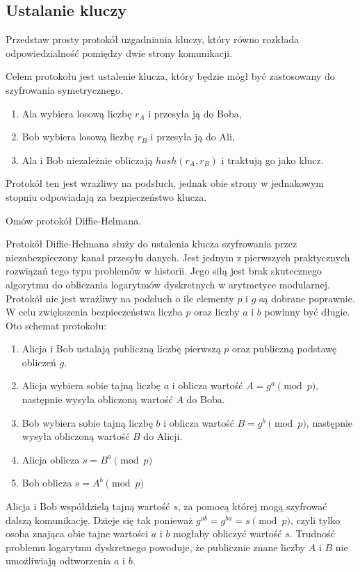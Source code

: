 \documentclass[answers,11pt]{exam}
\begin{document}
\begin{questions}
\end{questions}


\subsection{Ustalanie kluczy}
\begin{questions}

\question Przedstaw prosty protokół uzgadniania kluczy, który równo rozkłada odpowiedzialność pomiędzy dwie strony komunikacji.
\begin{solution}
Celem protokołu jest ustalenie klucza, który będzie mógł być zastosowany do szyfrowania symetrycznego. 
\begin{enumerate}
\item Ala wybiera losową liczbę $r_A$ i przesyła ją do Boba,
\item Bob wybiera losową liczbę $r_B$ i przesyła ją do Ali,
\item Ala i Bob niezależnie obliczają $hash(r_A, r_B)$ i traktują go jako klucz.
\end{enumerate}
Protokół ten jest wrażliwy na podsłuch, jednak obie strony w jednakowym stopniu odpowiadają za bezpieczeństwo klucza.
\end{solution}

\question Omów protokół Diffie-Helmana.
\begin{solution}
Protokół Diffie-Helmana służy do ustalenia klucza szyfrowania przez niezabezpieczony kanał przesyłu danych. Jest jednym z pierwszych praktycznych rozwiązań tego typu problemów w historii. Jego siłą jest brak skutecznego algorytmu do obliczania logarytmów dyskretnych w arytmetyce modularnej. Protokół nie jest wrażliwy na podsłuch o ile elementy $p$ i $g$ są dobrane poprawnie. W celu zwiększenia bezpieczeństwa liczba $p$ oraz liczby $a$ i $b$ powinny być długie. Oto schemat protokołu:
\begin{enumerate}
\item Alicja i Bob ustalają publiczną liczbę pierwszą $p$ oraz publiczną podstawę obliczeń $g$.
\item Alicja wybiera sobie tajną liczbę $a$ i oblicza wartość $A=g^{a} \pmod{p}$, następnie wysyła obliczoną wartość $A$ do Boba.
\item Bob wybiera sobie tajną liczbę $b$ i oblicza wartość $B=g^{b} \pmod{p}$, następnie wysyła obliczoną wartość $B$ do Alicji.
\item Alicja oblicza $s=B^{a} \pmod{p}$
\item Bob oblicza $s=A^{b} \pmod{p}$
\end{enumerate}
Alicja i Bob współdzielą tajną wartość $s$, za pomocą której mogą szyfrować dalszą komunikację. Dzieje się tak ponieważ $g^{ab}=g^{ba}=s \pmod{p}$, czyli tylko osoba znająca obie tajne wartości $a$ i $b$ mogłaby obliczyć wartość $s$. Trudność problemu logarytmu dyskretnego powoduje, że publicznie znane liczby $A$ i $B$ nie umożliwiają odtworzenia $a$ i $b$.
\end{solution}


\end{questions}
\end{document}
